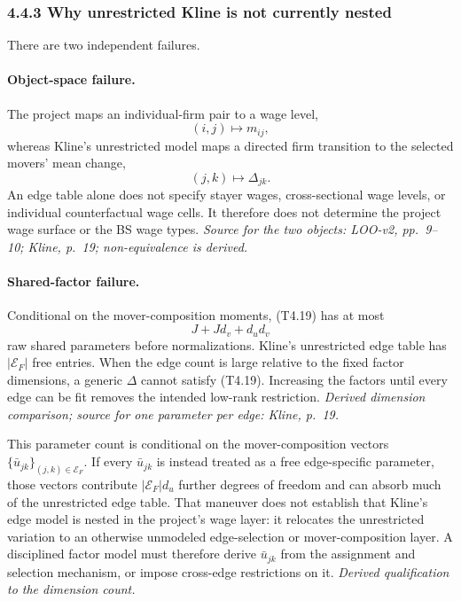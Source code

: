 \documentclass[11pt]{article}
\begin{document}
\subsubsection{4.4.3 Why unrestricted Kline is not currently nested}

There are two independent failures.

\paragraph{Object-space failure.}
The project maps an individual-firm pair to a wage level,
\[
(i,j)\longmapsto m_{ij},
\]
whereas Kline's unrestricted model maps a directed firm transition to the
selected movers' mean change,
\[
(j,k)\longmapsto\Delta_{jk}.
\]
An edge table alone does not specify stayer wages, cross-sectional wage levels,
or individual counterfactual wage cells.  It therefore does not determine the
project wage surface or the BS wage types.
\textit{Source for the two objects: LOO-v2, pp.\ 9--10; Kline, p.\ 19;
non-equivalence is derived.}

\paragraph{Shared-factor failure.}
Conditional on the mover-composition moments, (T4.19) has at most
\[
J+Jd_v+d_ud_v
\tag{T4.21}
\]
raw shared parameters before normalizations.  Kline's unrestricted edge table
has \(|\mathcal E_F|\) free entries.  When the edge count is large relative to
the fixed factor dimensions, a generic \(\Delta\) cannot satisfy (T4.19).
Increasing the factors until every edge can be fit removes the intended
low-rank restriction.
\textit{Derived dimension comparison; source for one parameter per edge:
Kline, p.\ 19.}

This parameter count is conditional on the mover-composition vectors
\(\{\bar u_{jk}\}_{(j,k)\in\mathcal E_F}\).  If every \(\bar u_{jk}\) is instead
treated as a free edge-specific parameter, those vectors contribute
\(|\mathcal E_F|d_u\) further degrees of freedom and can absorb much of the
unrestricted edge table.  That maneuver does not establish that Kline's edge
model is nested in the project's wage layer: it relocates the unrestricted
variation to an otherwise unmodeled edge-selection or mover-composition layer.
A disciplined factor model must therefore derive \(\bar u_{jk}\) from the
assignment and selection mechanism, or impose cross-edge restrictions on it.
\textit{Derived qualification to the dimension count.}
\end{document}

